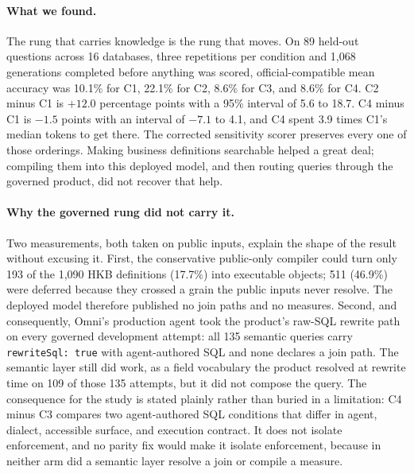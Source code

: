 \paragraph{What we found.}
The rung that carries knowledge is the rung that moves. On 89 held-out questions
across 16 databases, three repetitions per condition and 1,068 generations
completed before anything was scored, official-compatible mean accuracy was
10.1\% for C1, 22.1\% for C2, 8.6\% for C3, and 8.6\% for C4. C2 minus C1 is
$+12.0$ percentage points with a 95\% interval of 5.6 to 18.7. C4 minus C1 is
$-1.5$ points with an interval of $-7.1$ to 4.1, and C4 spent 3.9 times C1's
median tokens to get there. The corrected sensitivity scorer preserves every one
of those orderings. Making business definitions searchable helped a great deal;
compiling them into this deployed model, and then routing queries through the
governed product, did not recover that help.

\paragraph{Why the governed rung did not carry it.}
Two measurements, both taken on public inputs, explain the shape of the result
without excusing it. First, the conservative public-only compiler could turn
only 193 of the 1,090 HKB definitions (17.7\%) into executable objects; 511
(46.9\%) were deferred because they crossed a grain the public inputs never
resolve. The deployed model therefore published no join paths and no measures.
Second, and consequently, Omni's production agent took the product's raw-SQL
rewrite path on every governed development attempt: all 135 semantic queries
carry \texttt{rewriteSql: true} with agent-authored SQL and none declares a join
path. The semantic layer still did work, as a field vocabulary the product
resolved at rewrite time on 109 of those 135 attempts, but it did not compose the
query. The consequence for the study is stated plainly rather than buried in a
limitation: C4 minus C3 compares two agent-authored SQL conditions that differ in
agent, dialect, accessible surface, and execution contract. It does not isolate
enforcement, and no parity fix would make it isolate enforcement, because in
neither arm did a semantic layer resolve a join or compile a measure.

